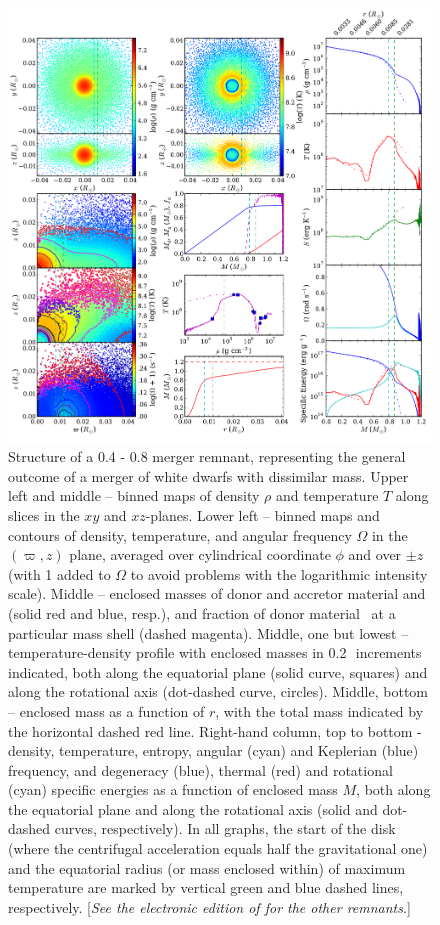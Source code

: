 \begin{figure}
\centering
\includegraphics[width=1.0\columnwidth]{chapter2_zhu+13/figures/pt4pt8.pdf}
\caption{Structure of a 0.4 - 0.8 {\Msun} merger remnant, representing the general outcome of a merger of white dwarfs with dissimilar mass.  Upper left and middle -- binned maps of density $\rho$ and temperature $T$ along slices in the $xy$ and $xz$-planes.  Lower left -- binned maps and contours of density, temperature, and angular frequency $\Omega$ in the $(\varpi,z)$ plane, averaged over cylindrical coordinate $\phi$ and over $\pm z$ (with 1 added to $\Omega$ to avoid problems with the logarithmic intensity scale).  Middle -- enclosed masses of donor and accretor material {\Md} and {\Ma} (solid red and blue, resp.), and fraction of donor material \fdon\ at a particular mass shell (dashed magenta).  Middle, one but lowest -- temperature-density profile with enclosed masses in 0.2\,\Msun\ increments indicated, both along the equatorial plane (solid curve, squares) and along the rotational axis (dot-dashed curve, circles).  Middle, bottom -- enclosed mass as a function of $r$, with the total mass indicated by the horizontal dashed red line.  Right-hand column, top to bottom - density, temperature, entropy, angular (cyan) and Keplerian (blue) frequency, and degeneracy (blue), thermal (red) and rotational (cyan) specific energies as a function of enclosed mass $M$, both along the equatorial plane and along the rotational axis (solid and dot-dashed curves, respectively).  In all graphs, the start of the disk (where the centrifugal acceleration equals half the gravitational one) and the equatorial radius (or mass enclosed within) of maximum temperature are marked by vertical green and blue dashed lines, respectively. [{\em See the electronic edition of \cite{zhu+13} for the other remnants}.]}
\label{fig:c2_mergersampling1}
\end{figure}

